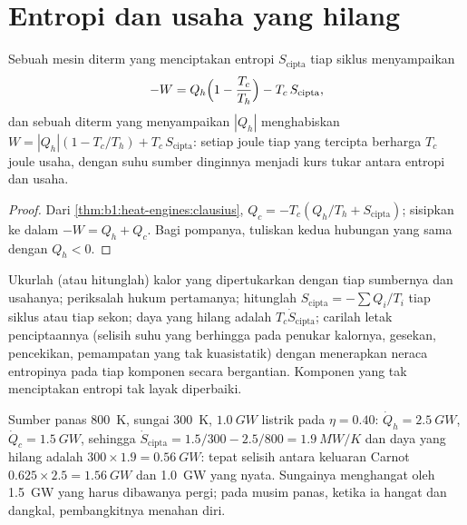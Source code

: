 \section{Entropi dan usaha yang hilang}

\begin{theorem}\label{thm:b1:heat-engines:lostwork}
Sebuah mesin diterm yang menciptakan entropi $S_{\mathrm{cipta}}$ tiap siklus
menyampaikan
\[
-W = Q_h\Bigl(1 - \frac{T_c}{T_h}\Bigr) - T_c\,S_{\mathrm{cipta}} ,
\]
dan sebuah  diterm yang menyampaikan $|Q_h|$ menghabiskan
$W = |Q_h|(1 - T_c/T_h) + T_c\,S_{\mathrm{cipta}}$: setiap joule tiap 
yang tercipta berharga $T_c$ joule usaha, dengan suhu sumber dinginnya
menjadi kurs tukar antara entropi dan usaha.
\end{theorem}

\begin{proof}
Dari \cref{thm:b1:heat-engines:clausius}, $Q_c = -T_c(Q_h/T_h + S_{\mathrm{cipta}})$;
sisipkan ke dalam $-W = Q_h + Q_c$. Bagi pompanya, tuliskan kedua hubungan yang sama
dengan $Q_h < 0$.
\end{proof}

\begin{method}\label{meth:b1:heat-engines:audit}
Ukurlah (atau hitunglah) kalor yang dipertukarkan dengan tiap sumbernya dan usahanya;
periksalah hukum pertamanya; hitunglah $S_{\mathrm{cipta}} = -\sum Q_i/T_i$ tiap siklus
atau tiap sekon; daya yang hilang adalah $T_c\dot S_{\mathrm{cipta}}$; carilah letak
penciptaannya (selisih suhu yang berhingga pada penukar kalornya, gesekan, pencekikan,
pemampatan yang tak kuasistatik) dengan menerapkan neraca entropinya pada tiap
komponen secara bergantian. Komponen yang tak menciptakan entropi tak layak
diperbaiki.
\end{method}

\begin{example}\label{ex:b1:heat-engines:audit}
Sumber panas \qty{800}{K}, sungai \qty{300}{K}, $\qty{1.0}{GW}$ listrik
pada $\eta = 0.40$: $\dot Q_h = \qty{2.5}{GW}$, $\dot Q_c = \qty{1.5}{GW}$, sehingga
$\dot S_{\mathrm{cipta}} = 1.5/300 - 2.5/800 = \qty{1.9}{MW/K}$ dan daya
yang hilang adalah $300 \times 1.9 = \qty{0.56}{GW}$: tepat selisih antara
keluaran Carnot $0.625 \times 2.5 = \qty{1.56}{GW}$ dan \qty{1.0}{GW} yang nyata.
Sungainya menghangat oleh \qty{1.5}{GW} yang harus dibawanya pergi; pada musim panas, ketika
ia hangat dan dangkal, pembangkitnya menahan diri.
\end{example}


